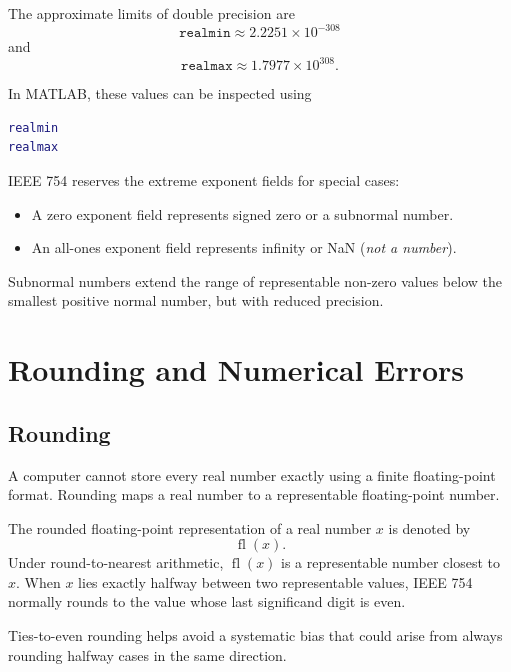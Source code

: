 The approximate limits of double precision are
\[
  \boxed{\texttt{realmin}\approx2.2251\times10^{-308}}
\]
and
\[
  \boxed{\texttt{realmax}\approx1.7977\times10^{308}.}
\]

In MATLAB, these values can be inspected using
\begin{lstlisting}[language=Matlab]
realmin
realmax
\end{lstlisting}

\begin{remark}
  IEEE 754 reserves the extreme exponent fields for special cases:
  \begin{itemize}
    \item A zero exponent field represents signed zero or a subnormal number.
    \item An all-ones exponent field represents infinity or NaN (\emph{not a number}).
  \end{itemize}
  Subnormal numbers extend the range of representable non-zero values below the smallest positive normal number, but with reduced precision.
\end{remark}

\section{Rounding and Numerical Errors}

\subsection{Rounding}

A computer cannot store every real number exactly using a finite floating-point format. Rounding maps a real number to a representable floating-point number.

\begin{definition}
  The rounded floating-point representation of a real number \(x\) is denoted by
  \[
    \boxed{\operatorname{fl}(x).}
  \]
  Under round-to-nearest arithmetic, \(\operatorname{fl}(x)\) is a representable number closest to \(x\). When \(x\) lies exactly halfway between two representable values, IEEE 754 normally rounds to the value whose last significand digit is even.
\end{definition}

\begin{remark}
  Ties-to-even rounding helps avoid a systematic bias that could arise from always rounding halfway cases in the same direction.
\end{remark}

